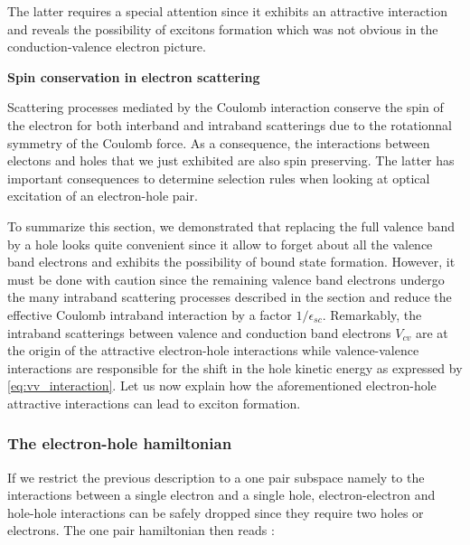 The latter requires a special attention since it exhibits an attractive interaction and reveals the possibility of excitons formation which was not obvious in the conduction-valence electron picture.
\bigskip

\noindent \large \textbf{Spin conservation in electron scattering } \normalsize
\bigskip


Scattering processes mediated by the Coulomb interaction conserve the spin of the electron for both interband and intraband scatterings due to the rotationnal symmetry of the Coulomb force. As a consequence,
the interactions between electons and holes that we just exhibited are also spin preserving. The latter has important consequences to determine
selection rules when looking at optical excitation of an electron-hole pair. 

\bigskip

\indent To summarize this section, we demonstrated that replacing the full valence band by a hole looks quite convenient since it allow to forget about all the valence band electrons and exhibits the possibility of bound state formation. However, it must be done with caution
since the remaining valence band electrons undergo the many intraband scattering processes described in the section and reduce the effective Coulomb intraband interaction by 
a factor $1/\epsilon_{sc}$. Remarkably, the intraband scatterings between valence and conduction band electrons $V_{cv}$ are at the origin of the attractive electron-hole interactions while valence-valence interactions are responsible for the shift in the hole kinetic energy as expressed by \autoref{eq:vv_interaction}.
Let us now explain how the aforementioned electron-hole attractive interactions can lead to exciton formation.

\subsubsection{The electron-hole hamiltonian}
\label{e-h_hamiltonian}

If we restrict the previous description to a one pair subspace namely to the interactions between a single electron and a single hole, electron-electron and hole-hole
interactions can be safely dropped since they require two holes or electrons. The one pair hamiltonian then reads : 


